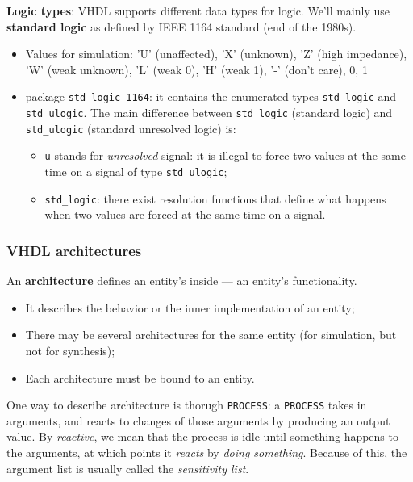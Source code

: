 \documentclass[a4paper,11pt]{article}
\begin{document}
\par\smallskip

\textbf{\textsf{Logic types}}: VHDL supports different data types for logic.
We'll mainly use \textbf{standard logic} as defined by IEEE 1164 standard (end of the 1980s).
\begin{itemize}
	\item Values for simulation: 'U' (unaffected), 'X' (unknown), 'Z' (high impedance), 'W' (weak unknown), 'L' (weak 0), 'H' (weak 1), '-' (don't care), 0, 1
	\item package \texttt{std\_logic\_1164}: it contains the enumerated types \texttt{std\_logic} and \texttt{std\_ulogic}. The main difference between \texttt{std\_logic} (standard logic) and  \texttt{std\_ulogic} (standard unresolved logic) is:
	      \begin{itemize}
		      \item \texttt{u} stands for \textit{unresolved} signal: it is illegal to force two values at the same time on a signal of type \texttt{std\_ulogic};
		      \item \texttt{std\_logic}: there exist resolution functions that define what happens when two values are forced at the same time on a signal.
	      \end{itemize}
\end{itemize}

\subsubsection{VHDL architectures}

An \textbf{architecture} defines an entity's inside --- an entity's functionality.
\begin{itemize}
	\item It describes the behavior or the inner implementation of an entity;
	\item There may be several architectures for the same entity (for simulation, but not for synthesis);
	\item Each architecture must be bound to an entity.
\end{itemize}

One way to describe architecture is thorugh \texttt{PROCESS}: a \texttt{PROCESS} takes in arguments, and reacts to changes of those arguments by producing an output value.
By \textit{reactive}, we mean that the process is idle until something happens to the arguments, at which points it \textit{reacts} by \textit{doing something}.
Because of this, the argument list is usually called the \textit{sensitivity list}.
\end{document}

